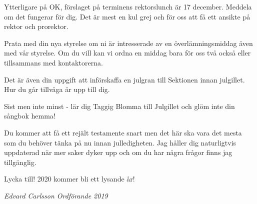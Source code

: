 \documentclass[10pt]{article}
\begin{document}
\begin{numplist}
    \item Ytterligare på OK, förslaget på terminens rektorslunch är 17 december. Meddela om det fungerar för dig. Det är mest en kul grej och för oss att få ett ansikte på rektor och prorektor.

    \item Prata med din nya styrelse om ni är intresserade av en överlämningsmiddag även med vår styrelse. Om du vill kan vi ordna en middag bara för oss två också eller tillsammans med kontaktorerna.  
    
    \item Det är även din uppgift att införskaffa en julgran till Sektionen innan julgillet. Hur du går tillväga är upp till dig. 
    
    \item Sist men inte minst - lär dig Taggig Blomma till Julgillet och glöm inte din sångbok hemma!
    
    \end{numplist}
    
    Du kommer att få ett rejält testamente snart men det här ska vara det mesta som du behöver tänka på nu innan julledigheten. Jag håller dig naturligtvis uppdaterad när mer saker dyker upp och om du har några frågor finns jag tillgänglig.
    
    Lycka till! 2020 kommer bli ett lysande år!
    
    \emph{Edvard Carlsson \newline Ordförande 2019}
    
    
\end{document}
